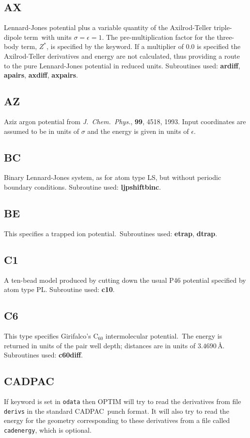 {{{\subsection{AX}Lennard-Jones potential plus a variable quantity of the Axilrod-Teller
triple-dipole term\cite{wales90c,doyew92}\ with units $\sigma=\epsilon=1$. 
The pre-multiplication factor for
the three-body term, $Z^*$, is specified by the {} keyword.
If a multiplier of $0.0$ is specified the Axilrod-Teller derivatives
and energy are not calculated, thus providing a route to the pure Lennard-Jones potential
in reduced units. Subroutines used: {\bf ardiff}, {\bf apairs}, {\bf axdiff}, {\bf axpairs}.

\subsection{AZ}Aziz argon potential from {\it J.~Chem.~Phys.\/}, {\bf 99}, 4518, 1993.
Input coordinates are assumed to be in units of $\sigma$ and the energy is given in
units of $\epsilon$.

\subsection{BC}Binary Lennard-Jones system, as for atom type LS, but without periodic
boundary conditions. Subroutine used: {\bf ljpshiftbinc}.

\subsection{BE}This specifies a trapped ion potential.\cite{walesl93}\
Subroutines used: {\bf etrap}, {\bf dtrap}.

\subsection{C1}A ten-bead model produced by cutting down the usual P46 potential specified
by atom type PL. Subroutine used: {\bf c10}.

\subsection{C6}This type specifies Girifalco's C$_{60}$ intermolecular potential.\cite{girifalco92}\
The energy is returned in units of the pair well depth; distances are in units of $3.4690\,$\AA.
Subroutines used: {\bf c60diff}.

\subsection{CADPAC}If keyword {} is set in {\tt odata} then
OPTIM will try to read the derivatives from file {\tt derivs} in the
standard CADPAC\cite{CADPAC}\ punch format. 
It will also try to read the energy for the geometry
corresponding to these derivatives from a file called {\tt cadenergy}, which is optional.

}}}

